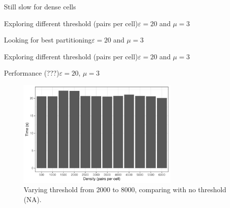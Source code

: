 \documentclass{beamer}
\begin{document}
\begin{frame}{Still slow for dense cells}
\begin{frame}{Exploring different threshold (pairs per cell)}{$\varepsilon=20$ and $\mu=3$}
\begin{frame}{Looking for best partitioning}{$\varepsilon=20$ and $\mu=3$}
        \centering
\end{frame}


\begin{frame}{Exploring different threshold (pairs per cell)}{$\varepsilon=20$ and $\mu=3$}
        \centering
\end{frame}

\begin{frame}{Performance (???)}{$\varepsilon=20$, $\mu=3$}
        \centering
        \begin{figure}
                \includegraphics[width=0.7\textwidth]{figures/Density/density}
                \caption{Varying threshold from 2000 to 8000, comparing with no threshold (NA).}
        \end{figure}
\end{frame}


\end{frame}
\end{frame}
\end{document}
